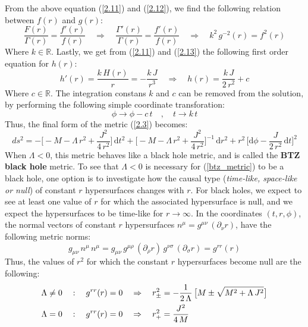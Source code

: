 %
%
From the above equation (\ref{2.11}) and (\ref{2.12}), we find the following relation between $f(r)$ and $g(r)$:
%
%
\begin{equation}\label{2.13}
\frac{F(r)}{\Gamma(r)} = \frac{f'(r)}{f(r)}
\quad \Rightarrow \quad
\frac{\Gamma'(r)}{\Gamma(r)} = \frac{f'(r)}{f(r)}
\quad \Rightarrow \quad
k^2 \, g^{-2}(r) = f^2(r)
\end{equation}
%
%
Where $k \in \mathbb{R}$. Lastly, we get from (\ref{2.11}) and (\ref{2.13}) the following first order equation for $h(r)$:
%
%
\begin{equation}
h'(r) = \frac{k \, H(r)}{r} = -\frac{k \, J}{r^3}
\quad \Rightarrow \quad
h(r) = \frac{k \, J}{2 \, r^2} + c
\end{equation}
%
%
Where $c \in \mathbb{R}$. The integration constans $k$ and $c$ can be removed from the solution, by performing the following simple coordinate transforation:
%
%
\begin{equation}
\phi \to \phi - c \, t
\quad , \quad
t \to k \, t
\end{equation}
%
%
Thus, the final form of the metric (\ref{2.3}) becomes:
%
%
\begin{equation}\label{btz_metric}
\boxed{
ds^2 = -\bigg[-M - \Lambda \, r^2 + \frac{J^2}{4 \, r^2} \bigg] \, \mathrm{d}t^2
+ \bigg[-M - \Lambda \, r^2 + \frac{J^2}{4 \, r^2} \bigg]^{-1} \, \mathrm{d}r^2
+ r^2 \, \bigg[ \mathrm{d}\phi
- \frac{J}{2 \, r^2} \, \mathrm{d}t \bigg]^2
}
\end{equation}
When $\Lambda < 0$, this metric behaves like a black hole metric, and is called the \textbf{BTZ black hole} metric. To see that $\Lambda < 0$ is necessary for (\ref{btz_metric}) to be a black hole, one option is to investigate how the causal type (\textit{time-like, space-like or null}) of constant $r$ hypersurfaces changes with $r$. For black holes, we expect to see at least one value of $r$ for which the associated hypersurface is null, and we expect the hypersurfaces to be time-like for $r \to \infty$. In the coordinates $(t, r, \phi)$, the normal vectors of constant $r$ hypersurfaces $n^{\mu} = g^{\mu\nu} \, (\partial_{\nu}r)$, have the following metric norms:
%
%
\begin{equation}
g_{\mu\nu} \, n^{\mu} \, n^{\mu}
= g_{\mu\nu} \, g^{\mu\rho} \, (\partial_{\rho}r) \, g^{\nu\sigma} \, (\partial_{\sigma}r)
= g^{rr}(r)
\end{equation}
%
%
Thus, the values of $r^2$ for which the constant $r$ hypersurfaces become null are the following:
%
%
\begin{align}\label{null_values}
\Lambda \neq 0
\quad & : \quad
g^{rr}(r) = 0
\quad \Rightarrow \quad
r^2_{\pm}
=  -\frac{1}{2 \, \Lambda} \, \big[
M \pm \sqrt{M^2 + \Lambda \, J^2}
\big]
%
\notag\\
%
\Lambda = 0
\quad & : \quad
g^{rr}(r) = 0
\quad \Rightarrow \quad
r^2_+ = \frac{J^2}{4 \, M}
\end{align}
